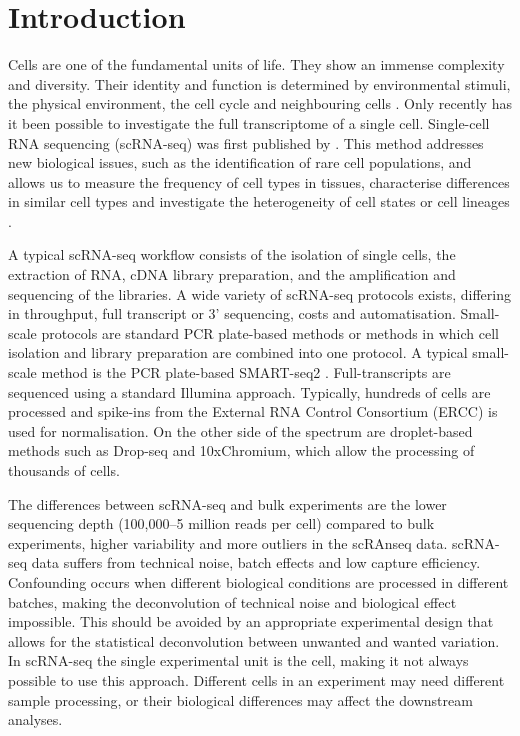 \documentclass[12pt, a4paper]{article}\usepackage[]{graphicx}\usepackage[]{color}
\begin{document}
\tableofcontents
\newpage
\section{Introduction}
Cells are one of the fundamental units of life. They show an immense complexity and diversity. Their identity and function is determined by environmental stimuli, the physical environment, the cell cycle and neighbouring cells \citep{wagner2016revealing}. Only recently has it been possible to investigate the full transcriptome of a single cell. Single-cell RNA sequencing (scRNA-seq) was first published by \citet{tang2009mrna}. This method addresses new biological issues, such as the identification of rare cell populations, and allows us to measure the frequency of cell types in tissues, characterise differences in similar cell types and investigate the heterogeneity of cell states or cell lineages \citep{andrews2017identifying}.

A typical scRNA-seq workflow consists of the isolation of single cells, the extraction of RNA, cDNA library preparation, and the amplification and sequencing of the libraries. A wide variety of scRNA-seq protocols exists, differing in throughput, full transcript or 3' sequencing, costs and automatisation. Small-scale protocols are standard PCR plate-based methods or methods in which cell isolation and library preparation are combined into one protocol. A typical small-scale method is the PCR plate-based SMART-seq2 \citep{picelli2013smart}. Full-transcripts are sequenced using a standard Illumina approach. Typically, hundreds of cells are processed and spike-ins from the External RNA Control Consortium (ERCC) is used for normalisation. On the other side of the spectrum are droplet-based methods such as Drop-seq and 10xChromium, which allow the processing of thousands of cells.

The differences between scRNA-seq and bulk experiments are the lower sequencing depth (100,000--5 million reads per cell) compared to bulk experiments, higher variability and more outliers in the scRAnseq data. scRNA-seq data suffers from technical noise, batch effects and low capture efficiency. Confounding occurs when different biological conditions are processed in different batches, making the deconvolution of technical noise and biological effect impossible. This should be avoided by an appropriate experimental design that allows for the statistical deconvolution between unwanted and wanted variation. In scRNA-seq the single experimental unit is the cell, making it not always possible to use this approach. Different cells in an experiment may need different sample processing, or their biological differences may affect the downstream analyses.
\end{document}

